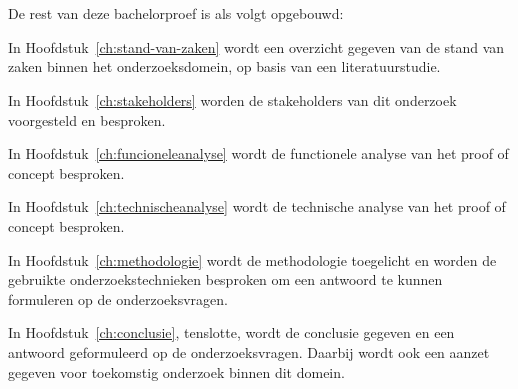 
\section{}
\label{sec:opzet-bachelorproef}


De rest van deze bachelorproef is als volgt opgebouwd:

In Hoofdstuk~\ref{ch:stand-van-zaken} wordt een overzicht gegeven van de stand van zaken binnen het onderzoeksdomein, op basis van een literatuurstudie.

In Hoofdstuk~\ref{ch:stakeholders} worden de stakeholders van dit onderzoek voorgesteld en besproken.

In Hoofdstuk~\ref{ch:funcioneleanalyse} wordt de functionele analyse van het proof of concept besproken.

In Hoofdstuk~\ref{ch:technischeanalyse} wordt de technische analyse van het proof of concept besproken.

In Hoofdstuk~\ref{ch:methodologie} wordt de methodologie toegelicht en worden de gebruikte onderzoekstechnieken besproken om een antwoord te kunnen formuleren op de onderzoeksvragen.


In Hoofdstuk~\ref{ch:conclusie}, tenslotte, wordt de conclusie gegeven en een antwoord geformuleerd op de onderzoeksvragen. Daarbij wordt ook een aanzet gegeven voor toekomstig onderzoek binnen dit domein.
